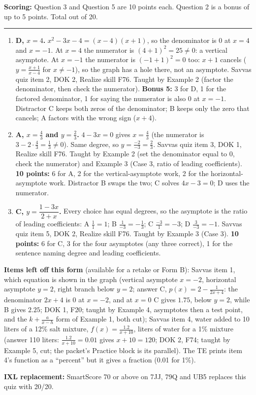 \documentclass[11pt]{article}
\begin{document}
\vfill
\noindent\textbf{Scoring:} Question 3 and Question 5 are 10 points each. Question 2 is a bonus of up to 5 points. Total out of 20.

\newpage
{}

\vspace{4pt}\noindent\rule{\textwidth}{0.6pt}

\begin{enumerate}
\item[\textbf{2.}] \textbf{D, $x=4$.} $x^2-3x-4=(x-4)(x+1)$, so the denominator is 0 at $x=4$ and $x=-1$. At $x=4$ the numerator is $(4+1)^2=25\neq0$: a vertical asymptote. At $x=-1$ the numerator is $(-1+1)^2=0$ too: $x+1$ cancels ($y=\frac{x+1}{x-4}$ for $x\neq-1$), so the graph has a hole there, not an asymptote. Savvas quiz item 2, DOK 2, Realize skill F76. Taught by Example 2 (factor the denominator, then check the numerator). \textbf{Bonus 5:} 3 for D, 1 for the factored denominator, 1 for saying the numerator is also 0 at $x=-1$. Distractor C keeps both zeros of the denominator; B keeps only the zero that cancels; A factors with the wrong sign ($x+4$).
\item[\textbf{3.}] \textbf{A, $x=\frac43$ and $y=\frac23$.} $4-3x=0$ gives $x=\frac43$ (the numerator is $3-2\cdot\frac43=\frac13\neq0$). Same degree, so $y=\frac{-2}{-3}=\frac23$. Savvas quiz item 3, DOK 1, Realize skill F76. Taught by Example 2 (set the denominator equal to 0, check the numerator) and Example 3 (Case 3, ratio of leading coefficients). \textbf{10 points:} 6 for A, 2 for the vertical-asymptote work, 2 for the horizontal-asymptote work. Distractor B swaps the two; C solves $4x-3=0$; D uses the numerator.
\item[\textbf{5.}] \textbf{C, $y=\dfrac{1-3x}{2+x}$.} Every choice has equal degrees, so the asymptote is the ratio of leading coefficients: A $\frac11=1$; B $\frac{1}{-3}=-\frac13$; C $\frac{-3}{1}=-3$; D $\frac{3}{-3}=-1$. Savvas quiz item 5, DOK 2, Realize skill F76. Taught by Example 3 (Case 3). \textbf{10 points:} 6 for C, 3 for the four asymptotes (any three correct), 1 for the sentence naming degree and leading coefficients.
\end{enumerate}

\textbf{Items left off this form} (available for a retake or Form B):
Savvas item 1, which equation is shown in the graph (vertical asymptote $x=-2$, horizontal asymptote $y=2$, right branch below $y=2$; answer C, $p(x)=2-\frac{1}{2x+4}$: the denominator $2x+4$ is 0 at $x=-2$, and at $x=0$ C gives $1.75$, below $y=2$, while B gives $2.25$; DOK 1, F20; taught by Example 4, asymptotes then a test point, and the $k+\frac{a}{x-h}$ form of Example 1, both cut);
Savvas item 4, water added to 10 liters of a 12\% salt mixture, $f(x)=\frac{1.2}{x+10}$, liters of water for a 1\% mixture (answer 110 liters: $\frac{1.2}{x+10}=0.01$ gives $x+10=120$; DOK 2, F74; taught by Example 5, cut; the packet's Practice block is its parallel). The TE prints item 4's function as a ``percent'' but it gives a fraction (0.01 for 1\%).

\textbf{IXL replacement:} SmartScore 70 or above on 7JJ, 79Q and UB5 replaces this quiz with 20/20.
\end{document}
